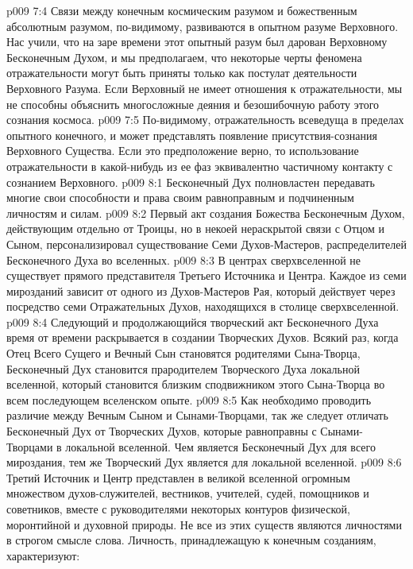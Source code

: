 \vs p009 7:4 \pc Связи между конечным космическим разумом и божественным абсолютным разумом, по\hyp{}видимому, развиваются в опытном разуме Верховного. Нас учили, что на заре времени этот опытный разум был дарован Верховному Бесконечным Духом, и мы предполагаем, что некоторые черты феномена отражательности могут быть приняты только как постулат деятельности Верховного Разума. Если Верховный не имеет отношения к отражательности, мы не способны объяснить многосложные деяния и безошибочную работу этого сознания космоса.
\vs p009 7:5 По\hyp{}видимому, отражательность всеведуща в пределах опытного конечного, и может представлять появление присутствия\hyp{}сознания Верховного Существа. Если это предположение верно, то использование отражательности в какой\hyp{}нибудь из ее фаз эквивалентно частичному контакту с сознанием Верховного.
\vs p009 8:1 Бесконечный Дух полновластен передавать многие свои способности и права своим равноправным и подчиненным личностям и силам.
\vs p009 8:2 Первый акт создания Божества Бесконечным Духом, действующим отдельно от Троицы, но в некоей нераскрытой связи с Отцом и Сыном, персонализировал существование Семи Духов\hyp{}Мастеров, распределителей Бесконечного Духа во вселенных.
\vs p009 8:3 В центрах сверхвселенной не существует прямого представителя Третьего Источника и Центра. Каждое из семи мирозданий зависит от одного из Духов\hyp{}Мастеров Рая, который действует через посредство семи Отражательных Духов, находящихся в столице сверхвселенной.
\vs p009 8:4 Следующий и продолжающийся творческий акт Бесконечного Духа время от времени раскрывается в создании Творческих Духов. Всякий раз, когда Отец Всего Сущего и Вечный Сын становятся родителями Сына\hyp{}Творца, Бесконечный Дух становится прародителем Творческого Духа локальной вселенной, который становится близким сподвижником этого Сына\hyp{}Творца во всем последующем вселенском опыте.
\vs p009 8:5 Как необходимо проводить различие между Вечным Сыном и Сынами\hyp{}Творцами, так же следует отличать Бесконечный Дух от Творческих Духов, которые равноправны с Сынами\hyp{}Творцами в локальной вселенной. Чем является Бесконечный Дух для всего мироздания, тем же Творческий Дух является для локальной вселенной.
\vs p009 8:6 \pc Третий Источник и Центр представлен в великой вселенной огромным множеством духов\hyp{}служителей, вестников, учителей, судей, помощников и советников, вместе с руководителями некоторых контуров физической, моронтийной и духовной природы. Не все из этих существ являются личностями в строгом смысле слова. Личность, принадлежащую к конечным созданиям, характеризуют:
